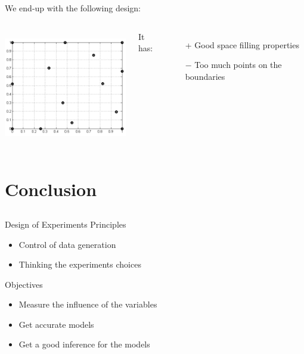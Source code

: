 \documentclass{beamer}
\begin{document}
\begin{frame}{}
We end-up with the following design:
\begin{columns}[c]
\column{6cm}
\begin{center}
\includegraphics[height=5cm]{figures/adaptativefinal}
\end{center}
\column{5cm}
It has:
\begin{itemize}
	\item[+] Good space filling properties
	\item[$-$] Too much points on the boundaries
\end{itemize}
\end{columns}
\end{frame}

\section[Concl.]{Conclusion}
\subsection{}

\begin{frame}{}
\begin{block}{Design of Experiments Principles}
	\begin{itemize}
		\item Control of data generation
		\item Thinking the experiments choices 
	\end{itemize}
\end{block}
\vspace{3mm}
\begin{block}{Objectives}
	\begin{itemize}
		\item Measure the influence of the variables 
		\item Get accurate models
		\item Get a good inference for the models
	\end{itemize}
\end{block}
\end{frame}
\end{document}

